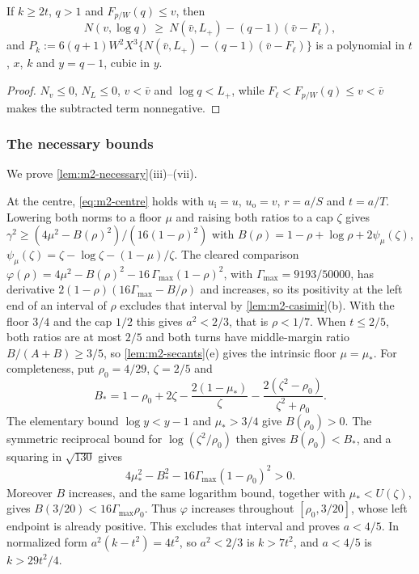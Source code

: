 \begin{lemma}\label{lem:m2-relax}
If $k\ge2t$, $q>1$ and $F_{p/W}(q)\le v$, then
\[
N(v,\log q)\ \ge\ N(\bar v,L_+)-(q-1)(\bar v-F_\ell),
\]
and $P_k:=6(q+1)W^2X^3\{N(\bar v,L_+)-(q-1)(\bar v-F_\ell)\}$ is a polynomial in $t$, $x$, $k$ and
$y=q-1$, cubic in $y$.
\end{lemma}

\begin{proof}
$N_v\le0$, $N_L\le0$, $v<\bar v$ and $\log q<L_+$, while $F_\ell<F_{p/W}(q)\le v<\bar v$ makes the
subtracted term nonnegative.
\end{proof}

\subsubsection{The necessary bounds}\label{app:m2-bounds}

We prove \cref{lem:m2-necessary}(iii)--(vii).

 At the centre, \eqref{eq:m2-centre} holds with $u_{\mathrm i}=u$,
$u_{\mathrm o}=v$, $r=a/S$ and $t=a/T$. Lowering both norms to a floor $\mu$ and raising both ratios
to a cap $\zeta$ gives $\gamma^2\ge(4\mu^2-B(\rho)^2)/(16(1-\rho)^2)$ with
$B(\rho)=1-\rho+\log\rho+2\psi_\mu(\zeta)$, $\psi_\mu(\zeta)=\zeta-\log\zeta-(1-\mu)/\zeta$. The
cleared comparison $\varphi(\rho)=4\mu^2-B(\rho)^2-16\,\Gamma_{\max}(1-\rho)^2$, with
$\Gamma_{\max}=9193/50000$, has derivative $2(1-\rho)(16\Gamma_{\max}-B/\rho)$ and increases, so its
positivity at the left end of an interval of $\rho$ excludes that interval by
\cref{lem:m2-casimir}(b). With the floor $3/4$ and the cap $1/2$ this gives $a^2<2/3$, that is
$\rho<1/7$. When $t\le2/5$, both ratios are at most $2/5$ and both turns have middle-margin ratio
$B/(A+B)\ge3/5$, so \cref{lem:m2-secants}(e) gives the intrinsic floor $\mu=\mu_*$.
For completeness, put $\rho_0=4/29$, $\zeta=2/5$ and
\[
 B_* =1-\rho_0+2\zeta-\frac{2(1-\mu_*)}{\zeta}
       -\frac{2(\zeta^2-\rho_0)}{\zeta^2+\rho_0}.
\]
The elementary bound $\log y<y-1$ and $\mu_*>3/4$ give $B(\rho_0)>0$.
The symmetric reciprocal bound for $\log(\zeta^2/\rho_0)$ then gives
$B(\rho_0)<B_*$, and a squaring in $\sqrt{130}$ gives
\[
 4\mu_*^2-B_*^2-16\Gamma_{\max}(1-\rho_0)^2>0.
\]
Moreover $B$ increases, and the same logarithm bound, together with
$\mu_*<U(\zeta)$, gives $B(3/20)<16\Gamma_{\max}\rho_0$.
Thus $\varphi$ increases throughout $[\rho_0,3/20]$, whose left endpoint
is already positive. This excludes that interval and proves $a<4/5$.
In normalized form $a^2(k-t^2)=4t^2$, so $a^2<2/3$ is $k>7t^2$, and $a<4/5$
is $k>29t^2/4$.

